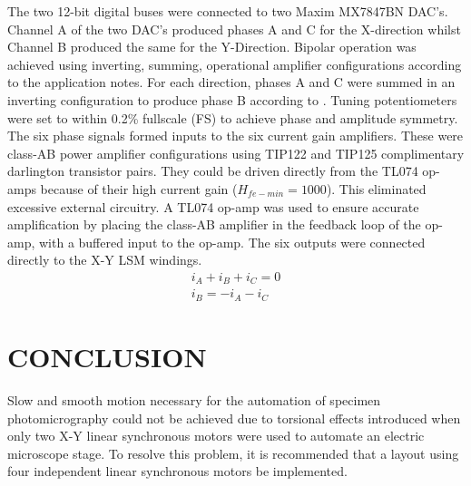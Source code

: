 \documentclass[10pt,twocolumn]{witseiepaper}
\begin{document}
The two 12-bit digital buses were connected to two Maxim MX7847BN DAC's.
Channel A of the two DAC's produced phases A and C for the X-direction whilst
Channel B produced the same for the Y-Direction.  Bipolar operation was
achieved using inverting, summing, operational amplifier configurations
according to the application notes.  For each direction, phases A and C were
summed in an inverting configuration to produce phase B according to
.  Tuning potentiometers were set to within 0.2\% fullscale
(FS) to achieve phase and amplitude symmetry.  The six phase signals formed
inputs to the six current gain amplifiers.  These were class-AB power
amplifier configurations using TIP122 and TIP125 complimentary darlington
transistor pairs.  They could be driven directly from the TL074 op-amps
because of their high current gain ($H_{fe-min}=1000$).  This eliminated
excessive external circuitry.  A TL074 op-amp was used to ensure accurate
amplification by placing the class-AB amplifier in the feedback loop of the
op-amp, with a buffered input to the op-amp.  The six outputs were connected
directly to the X-Y LSM windings.  \begin{eqnarray}
	i_A+i_B+i_C = 0\nonumber\\
	i_B = -i_A-i_C\label{eqn:3Phase}
\end{eqnarray}


\section{CONCLUSION}

Slow and smooth motion necessary for the automation of specimen
photomicrography could not be achieved due to torsional effects introduced
when only two X-Y linear synchronous motors were used to automate an electric
microscope stage. To resolve this problem, it is recommended that a layout
using four independent linear synchronous motors be implemented.






\end{document}

